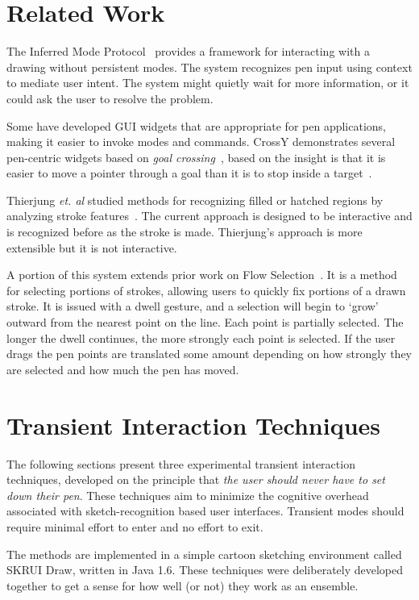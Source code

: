 \documentclass{egpubl}
\begin{document}
\section{Related Work}

The Inferred Mode Protocol~\cite{saund-inferred-mode} provides a
framework for interacting with a drawing without persistent modes. The
system recognizes pen input using context to mediate user intent. The
system might quietly wait for more information, or it could ask the
user to resolve the problem.

Some have developed GUI widgets that are appropriate for pen
applications, making it easier to invoke modes and commands. CrossY
demonstrates several pen-centric widgets based on \emph{goal
  crossing}~\cite{apitz-crossy}, based on the insight is that it is
easier to move a pointer through a goal than it is to stop inside a
target~\cite{accot-crossing}.

Thierjung \textit{et. al} studied methods for recognizing filled or
hatched regions by analyzing stroke
features~\cite{thierjung-hatching}. The current approach is designed
to be interactive and is recognized before as the stroke is
made. Thierjung's approach is more extensible but it is not
interactive.

A portion of this system extends prior work on Flow
Selection~\cite{johnson-flow-selection}. It is a method for selecting
portions of strokes, allowing users to quickly fix portions of a drawn
stroke. It is issued with a dwell gesture, and a selection will begin
to `grow' outward from the nearest point on the line. Each point is
partially selected. The longer the dwell continues, the more strongly
each point is selected. If the user drags the pen points are
translated some amount depending on how strongly they are selected and
how much the pen has moved.

\section{Transient Interaction Techniques}

The following sections present three experimental transient
interaction techniques, developed on the principle that \emph{the user
  should never have to set down their pen}. These techniques aim to
minimize the cognitive overhead associated with sketch-recognition
based user interfaces. Transient modes should require minimal effort
to enter and no effort to exit.

The methods are implemented in a simple cartoon sketching environment
called SKRUI Draw, written in Java 1.6. These techniques were
deliberately developed together to get a sense for how well (or not)
they work as an ensemble.
\end{document}
